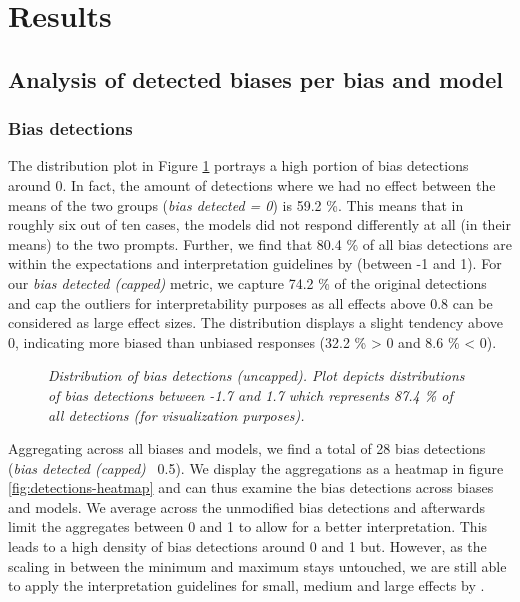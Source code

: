 \section{Results}
\label{chapter:results}

\subsection{Analysis of detected biases per bias and model}
\subsubsection{Bias detections}
\par The distribution plot in Figure \ref{fig:detections-distribution} portrays a high portion of bias detections around 0. In fact, the amount of detections where we had no effect between the means of the two groups (\textit{bias detected = 0}) is 59.2 \%. This means that in roughly six out of ten cases, the models did not respond differently at all (in their means) to the two prompts. Further, we find that 80.4 \% of all bias detections are within the expectations and interpretation guidelines by \textcite{cohen1988statistical} (between -1 and 1). For our \textit{bias detected (capped)} metric, we capture 74.2 \% of the original detections and cap the outliers for interpretability purposes  as all effects above 0.8 can be considered as large effect sizes. The distribution displays a slight tendency above 0, indicating more biased than unbiased responses (32.2 \% > 0 and 8.6 \% < 0).

\begin{figure}[htbp]
    \centering
    
    \caption[Distribution of bias detections]{\centering \textit{Distribution of bias detections (uncapped). Plot depicts distributions of bias detections between -1.7 and 1.7 which represents 87.4 \% of all detections (for visualization purposes).}}
    \label{fig:detections-distribution}
\end{figure}

\par Aggregating across all biases and models, we find a total of 28 bias detections (\textit{bias detected (capped)} \geq\, 0.5). We display the aggregations as a heatmap in figure \ref{fig:detections-heatmap} and can thus examine the bias detections across biases and models. We average across the unmodified bias detections and afterwards limit the aggregates between 0 and 1 to allow for a better interpretation. This leads to a high density of bias detections around 0 and 1 but. However, as the scaling in between the minimum and maximum stays untouched, we are still able to apply the interpretation guidelines for small, medium and large effects by \textcite{cohen1988statistical}.

